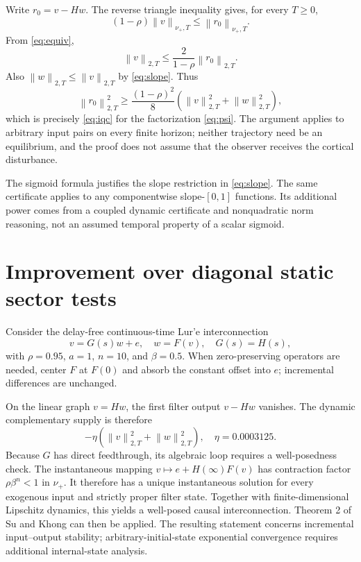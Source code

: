 \documentclass[final,5p,twocolumn]{elsarticle}
\theoremstyle{definition}
\theoremstyle{remark}
\newcommand{\normNT}[1]{\left\lVert #1\right\rVert_{\nu_+,T}}
\newcommand{\normTwoT}[1]{\left\lVert #1\right\rVert_{2,T}}
\begin{document}
Write $r_0=v-Hw$. The reverse triangle inequality gives, for every $T\ge0$,
\begin{equation}\label{eq:reverse}
 (1-\rho)\normNT{v}\le\normNT{r_0}.
\end{equation}
From \eqref{eq:equiv},
\begin{equation}\label{eq:euclidean}
 \normTwoT{v}\le\frac{2}{1-\rho}\normTwoT{r_0}.
\end{equation}
Also $\normTwoT{w}\le\normTwoT{v}$ by \eqref{eq:slope}. Thus
\begin{equation}\label{eq:mainbound}
 \normTwoT{r_0}^2\ge\frac{(1-\rho)^2}{8}\left(\normTwoT{v}^2+\normTwoT{w}^2\right),
\end{equation}
which is precisely \eqref{eq:iqc} for the factorization \eqref{eq:psi}. The argument applies to arbitrary input pairs on every finite horizon; neither trajectory need be an equilibrium, and the proof does not assume that the observer receives the cortical disturbance.

The sigmoid formula justifies the slope restriction in \eqref{eq:slope}. The same certificate applies to any componentwise slope-$[0,1]$ functions. Its additional power comes from a coupled dynamic certificate and nonquadratic norm reasoning, not an assumed temporal property of a scalar sigmoid.

\section{Improvement over diagonal static sector tests}\label{sec:comparison}
Consider the delay-free continuous-time Lur'e interconnection
\begin{equation}\label{eq:lure}
 v=G(s)w+e,\quad w=F(v),\quad G(s)=H(s),
\end{equation}
with $\rho=0.95$, $a=1$, $n=10$, and $\beta=0.5$. When zero-preserving operators are needed, center $F$ at $F(0)$ and absorb the constant offset into $e$; incremental differences are unchanged.

On the linear graph $v=Hw$, the first filter output $v-Hw$ vanishes. The dynamic complementary supply is therefore
\begin{equation}\label{eq:complement}
 -\eta\left(\normTwoT{v}^2+\normTwoT{w}^2\right),\quad\eta=0.0003125.
\end{equation}
Because $G$ has direct feedthrough, its algebraic loop requires a well-posedness check. The instantaneous mapping $v\mapsto e+H(\infty)F(v)$ has contraction factor $\rho\beta^n<1$ in $\nu_+$. It therefore has a unique instantaneous solution for every exogenous input and strictly proper filter state. Together with finite-dimensional Lipschitz dynamics, this yields a well-posed causal interconnection. Theorem 2 of Su and Khong \cite{suKhong} can then be applied. The resulting statement concerns incremental input--output stability; arbitrary-initial-state exponential convergence requires additional internal-state analysis.
\end{document}
